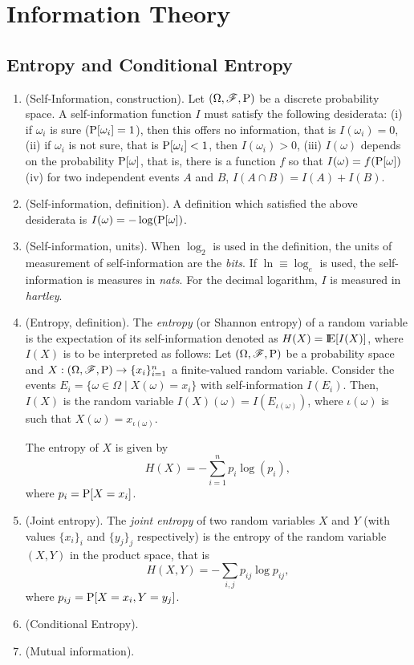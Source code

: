 \documentclass[a4paper,10pt]{scrbook}
\begin{document}
\chapter{Information Theory}
\section{Entropy and Conditional Entropy}
\begin{enumerate}
 \item (Self-Information, construction). Let $(\Omega,\mathscr{F},\mathrm{P})$ be a discrete probability space. A self-information function $I$ must satisfy the 
       following desiderata: 
       (i) if $\omega_i$ is sure ($\mathrm{P}[\omega_i]=1$), then this offers no information, that is $I(\omega_i)=0$, 
       (ii) if $\omega_i$ is not sure, that is $\mathrm{P}[\omega_i]<1$, then $I(\omega_i)>0$,
       (iii) $I(\omega)$ depends on the probability $\mathrm{P}[\omega]$, that is, there is a function $f$ so that $I(\omega)=f(\mathrm{P}[\omega])$
       (iv) for two independent events $A$ and $B$, $I(A\cap B)=I(A)+I(B)$.
 \item (Self-information, definition). A definition which satisfied the above desiderata is $I(\omega)=-\log(\mathrm{P}[\omega])$. 
 \item (Self-information, units). When $\log_2$ is used in the definition, the units of measurement of self-information are the \textit{bits}.
       If $\ln\equiv \log_e$ is used, the self-information is measures in \textit{nats}. 
       For the decimal logarithm, $I$ is measured in \textit{hartley}.
 \item (Entropy, definition). The \textit{entropy} (or Shannon entropy) of a random variable is the expectation of its self-information denoted 
       as $H(X)=\E[I(X)]$, where $I(X)$ is to be interpreted as follows: Let $(\Omega,\mathscr{F},\mathrm{P})$ be a probability space and $X:(\Omega,\mathscr{F},\mathrm{P})\to \{x_i\}_{i=1}^{n}$
       a finite-valued random variable. Consider the events $E_i=\{\omega\in\Omega {}\mid{} X(\omega) = x_i\}$ with self-information 
       $I(E_i)$. Then, $I(X)$ is the random variable $I(X)(\omega) = I(E_{\iota(\omega)})$, where $\iota(\omega)$ is such 
       that $X(\omega) = x_{\iota(\omega)}$.
       
       The entropy of $X$ is given by
       \[
        H(X) = -\sum_{i=1}^{n}p_i \log(p_i),
       \]
       where $p_i = \mathrm{P}[X=x_i]$.
 \item (Joint entropy). The \textit{joint entropy} of two random variables $X$ and $Y$ (with values $\{x_i\}_i$ and $\{y_j\}_j$
       respectively) is the entropy of the random variable 
       $(X,Y)$ in the product space, that is
       \[
        H(X,Y) = -\sum_{i,j}p_{ij}\log p_{ij},
       \]
       where $p_{ij} = \mathrm{P}[X=x_i, Y=y_j]$.
 \item (Conditional Entropy).
 \item (Mutual information).
\end{enumerate}
\end{document}
